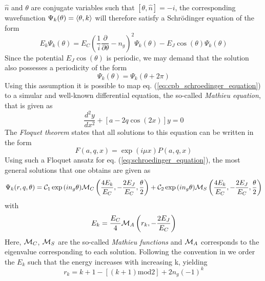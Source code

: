 \smallskip

$\hat{n}$ and $\theta$ are conjugate variables such that $[\theta,\hat{n}]=-i$, the corresponding wavefunction $\Psi_k(\theta) = \left< \theta,k \right>$ will therefore satisfy a Schrödinger equation of the form
%
\begin{equation}
E_k \Psi_k(\theta) = E_C(\frac{1}{i}\frac{\partial}{\partial \theta}-n_g)^2 \Psi_k(\theta) - E_J \cos{\left(\theta\right)}\Psi_k(\theta) \label{eq:cpb_schroedinger_equation}
\end{equation}
%
Since the potential $E_J\cos{(\theta)}$ is periodic, we may demand that the solution also possesses a periodicity of the form
%
\begin{equation}
\Psi_k(\theta) = \Psi_k(\theta+2\pi)
\end{equation}
%
Using this assumption it is possible to map eq. (\ref{eq:cpb_schroedinger_equation}) to a simular and well-known differential equation, the so-called {\it Mathieu  equation}, that is given as
%
\begin{equation}
\frac{d^2y}{dx^2}+\left[a-2q\cos{(2x)}\right]y = 0
\end{equation}
%
The {\it Floquet theorem} states that all solutions to this equation can be written in the form
%
\begin{equation}
F(a,q,x) = \exp{\left(i\mu x\right)}P(a,q,x)
\end{equation}
%
Using such a Floquet ansatz for eq. (\ref{eq:schroedinger_equation}), the most general solutions that one obtains are given as \citep{cottet_implementation_2002}
%
\begin{equation}
\Psi_k(r,q,\theta) = \mcal{C}_1\exp{\left(i n_g \theta \right)}\mcal{M}_C\left(\frac{4E_k}{E_C},-\frac{2E_J}{E_C},\frac{\theta}{2}\right)+\mcal{C}_2\exp{\left(i n_g \theta \right)}\mcal{M}_S \left(\frac{4 E_k}{E_C},-\frac{2 E_J}{E_C},\frac{\theta}{2}\right)
\end{equation}
%
with 
%
\begin{equation}
E_k = \frac{E_C}{4}\mcal{M}_A \left(r_k,-\frac{2 E_J}{E_C} \right)
\end{equation}
%
Here, $\mcal{M}_C$, $\mcal{M}_S$ are the so-called {\it Mathieu functions} and $\mcal{M}_A$ corresponds to the eigenvalue corresponding to each solution. Following the convention in \citep{cottet_implementation_2002} we order the $E_k$ such that the energy increases with increasing k, yielding
%
\begin{equation}
r_k = k+1-\left[(k+1)\mathrm{mod}2\right]+2n_g(-1)^k
\end{equation}
%

